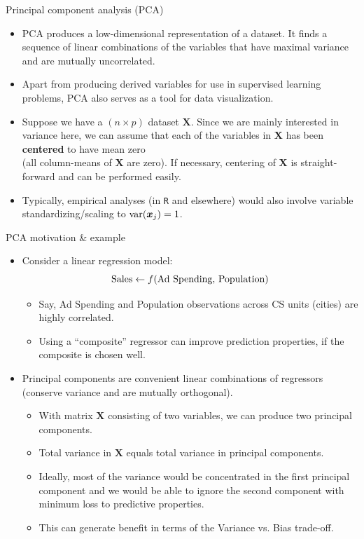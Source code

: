 \documentclass{beamer}
\begin{document}
\begin{frame}{Principal component analysis (PCA)}
\begin{itemize}
\item PCA produces a low-dimensional representation of a dataset. It finds a sequence of linear combinations of the variables that have maximal variance and are mutually uncorrelated.
\medskip
\item Apart from producing derived variables for use in supervised learning problems, PCA also serves as a tool for data visualization.
\medskip
\item Suppose we have a $(n \! \times \! p)$ dataset $\bm{X}$. Since we are mainly interested in variance here, we can assume that each of the variables in $\bm{X}$ has been \textbf{centered} to have mean zero \\(all column-means of $\bm{X}$ are zero). If necessary, centering of $\bm{X}$ is straight-forward and can be performed easily.
\medskip
\item Typically, empirical analyses (in \texttt{R} and elsewhere) would also involve variable standardizing/scaling to $\textnormal{var}(\bm{x}_j)=1$.
\end{itemize}
\end{frame}
\begin{frame}{PCA motivation \& example}
\begin{itemize}
    \item Consider a linear regression model:
    $$
    \textnormal{Sales} \leftarrow f(\textnormal{Ad Spending, Population})
    $$
    \vspace{-0.5cm}
    \begin{itemize}
        \item Say, Ad Spending and Population observations across CS units (cities) are highly correlated.
        \item Using a ``composite'' regressor can improve prediction properties, if the composite is chosen well.
    \end{itemize}
    \medskip
    \item Principal components are convenient linear combinations of regressors (conserve variance and are mutually orthogonal).
    \begin{itemize}
        \item With matrix $\bm{X}$ consisting of two variables, we can produce two principal components.
        \item Total variance in $\bm{X}$ equals total variance in principal components. 
        \item Ideally, most of the variance would be concentrated in the first principal component and we would be able to ignore the second component with minimum loss to predictive properties.
        \item This can generate benefit in terms of the Variance vs. Bias trade-off. 
    \end{itemize}
\end{itemize}
\end{frame}
\end{document}
